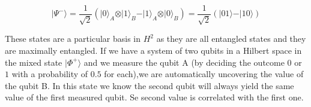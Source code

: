 \begin{equation}
\vert\Psi^{-}\rangle=\frac{1}{\sqrt{2}}(\vert0\rangle_{A} \otimes\vert1\rangle_{B} -\vert1\rangle_{A} \otimes\vert0\rangle_{B})=\frac{1}{\sqrt{2}}(\vert01\rangle-\vert10\rangle)
\end{equation}

These states are a particular basis in $H^2$ as they are all entangled states and they are maximally entangled. If we have a system of two qubits in a Hilbert space in the mixed state $\vert\Phi^{+}\rangle$ and we measure the qubit A (by deciding the outcome $0$ or $1$ with a probability of $0.5$ for each),we are automatically uncovering the value of the qubit B. In this state we know the second qubit will always yield the same value of the first measured qubit. Se second value is correlated with the first one.
















